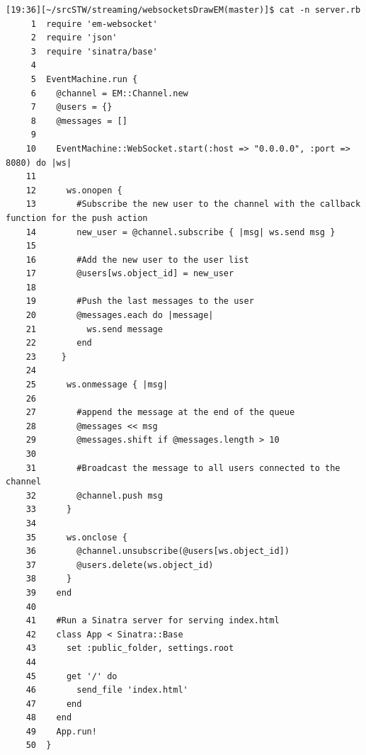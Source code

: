 \begin{verbatim}
[19:36][~/srcSTW/streaming/websocketsDrawEM(master)]$ cat -n server.rb 
     1  require 'em-websocket'
     2  require 'json'
     3  require 'sinatra/base'
     4  
     5  EventMachine.run {
     6    @channel = EM::Channel.new
     7    @users = {}
     8    @messages = []
     9  
    10    EventMachine::WebSocket.start(:host => "0.0.0.0", :port => 8080) do |ws|
    11        
    12      ws.onopen {
    13        #Subscribe the new user to the channel with the callback function for the push action
    14        new_user = @channel.subscribe { |msg| ws.send msg }
    15        
    16        #Add the new user to the user list
    17        @users[ws.object_id] = new_user
    18        
    19        #Push the last messages to the user
    20        @messages.each do |message|
    21          ws.send message
    22        end
    23     }
    24  
    25      ws.onmessage { |msg|
    26        
    27        #append the message at the end of the queue
    28        @messages << msg
    29        @messages.shift if @messages.length > 10
    30  
    31        #Broadcast the message to all users connected to the channel
    32        @channel.push msg
    33      }
    34  
    35      ws.onclose { 
    36        @channel.unsubscribe(@users[ws.object_id])
    37        @users.delete(ws.object_id)
    38      }
    39    end
    40  
    41    #Run a Sinatra server for serving index.html
    42    class App < Sinatra::Base
    43      set :public_folder, settings.root
    44      
    45      get '/' do
    46        send_file 'index.html'
    47      end
    48    end
    49    App.run!
    50  } 
\end{verbatim}

